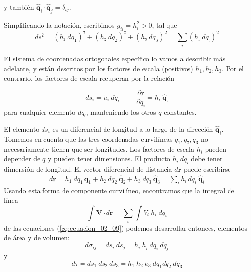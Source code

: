 y también $\mathbf{\widehat{q}}_{i} \cdot \mathbf{\widehat{q}}_{j} = \delta_{ij}$.
\par
Simplificando la notación, escribimos $g_{ii} = h_{i}^{2} > 0$, tal que
\begin{equation}
ds^{2} = (h_{1} \: dq_{1})^{2} + (h_{2} \: dq_{2})^{2} + (h_{3} \: dq_{3})^{2} = \sum_{i} (h_{i} \: dq_{i})^{2} 
\label{eq:ecuacion_02_08}
\end{equation}

El sistema de coordenadas ortogonales específico lo vamos a describir más adelante, y están descritos por los factores de escala (positivos) $h_{1}, h_{2}, h_{3}$. Por el contrario, los factores de escala recuperan por la relación

\begin{equation}
ds_{i} = h_{i} \: dq_{i} \hspace{1cm} \dfrac{\partial \mathbf{r}}{\partial q_{i}} = h_{i} \: \mathbf{\widehat{q}}_{i} 
\label{eq:ecuacion_02_09}
\end{equation}
para cualquier elemento $dq_{i}$, manteniendo los otros $q$ constantes.
\par
El elemento $ds_{i}$ es un diferencial de longitud a lo largo de la dirección $\mathbf{\widehat{q}}_{i}$. Tomemos en cuenta que las tres coordenadas curvilíneas $q_{1},q_{2},q_{3}$ no necesariamente tienen  que ser longitudes. Los factores de escala $h_{i}$ pueden depender de $q$ y pueden tener dimensiones. El producto $h_{i} \: dq_{i}$ debe tener dimensión de longitud. El vector diferencial de distancia $d\mathbf{r}$ puede escribirse
\begin{align*} 
d \mathbf{r} =  h_{1} \: dq_{1} \: \mathbf{\widehat{q}}_{1} + h_{2} \: dq_{2} \: \mathbf{\widehat{q}}_{2} + h_{3} \: dq_{3} \: \mathbf{\widehat{q}}_{3} = \sum_{i} h_{i} \: dq_{i} \: \mathbf{\widehat{q}}_{i}
\end{align*}
Usando esta forma de componente curvilíneo, encontramos que la integral de línea
\[ \int \mathbf{V} \cdot d \mathbf{r} = \sum_{i} \int V_{i} \: h_{i} \: dq_{i}  \]
de las ecuaciones (\ref{eq:ecuacion_02_09}) podemos desarrollar entonces, elementos de área y de volumen:
\begin{equation}
d \sigma_{ij} = ds_{i} \: ds_{j} =  h_{i} \: h_{j} \: dq_{i} \: dq_{j}
\label{eq:ecuacion_02_10}
\end{equation}
y
\begin{equation}
d \tau = ds_{1} \: ds_{2} \: ds_{3} =  h_{1} \: h_{2} \: h_{3} \: dq_{1} dq_{2} \: dq_{3}
\label{eq:ecuacion_02_11}
\end{equation}
